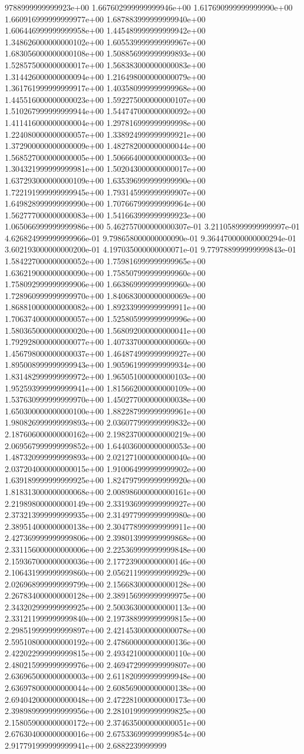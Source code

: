 9788999999999923e+00	1.667602999999999946e+00	1.617690999999999990e+00	1.660916999999999977e+00	1.687883999999999940e+00	1.606446999999999958e+00	1.445489999999999942e+00	1.348626000000000102e+00	1.605539999999999967e+00	1.683056000000000108e+00	1.508856999999999893e+00	1.528575000000000017e+00	1.568383000000000083e+00	1.314426000000000094e+00	1.216498000000000079e+00	1.361761999999999917e+00	1.403580999999999968e+00	1.445516000000000023e+00	1.592275000000000107e+00	1.510267999999999944e+00	1.544747000000000092e+00	1.411416000000000004e+00	1.297816999999999998e+00	1.224080000000000057e+00	1.338924999999999921e+00	1.372900000000000009e+00	1.482782000000000044e+00	1.568527000000000005e+00	1.506664000000000003e+00	1.304321999999999981e+00	1.502043000000000017e+00	1.637293000000000109e+00	1.635396999999999990e+00	1.722191999999999945e+00	1.793145999999999907e+00	1.649828999999999990e+00	1.707667999999999964e+00	1.562777000000000083e+00	1.541663999999999923e+00	1.065066999999999986e+00	5.462757000000000307e-01	3.211058999999999997e-01	4.626824999999999966e-01	9.798658000000000090e-01	9.364470000000000294e-01	3.602193000000000200e-01	4.197035000000000071e-01	9.779788999999999843e-01	1.584227000000000052e+00	1.759816999999999965e+00	1.636219000000000090e+00	1.758507999999999960e+00	1.758092999999999906e+00	1.663869999999999960e+00	1.728960999999999970e+00	1.840683000000000069e+00	1.868810000000000082e+00	1.892339999999999911e+00	1.706374000000000057e+00	1.525805999999999996e+00	1.580365000000000020e+00	1.568092000000000041e+00	1.792928000000000077e+00	1.407337000000000060e+00	1.456798000000000037e+00	1.464874999999999927e+00	1.895008999999999943e+00	1.905961999999999934e+00	1.831482999999999972e+00	1.965051000000000103e+00	1.952593999999999941e+00	1.815662000000000109e+00	1.537630999999999970e+00	1.450277000000000038e+00	1.650300000000000100e+00	1.882287999999999961e+00	1.980826999999999893e+00	2.036077999999999832e+00	2.187606000000000162e+00	2.198237000000000219e+00	2.069567999999999852e+00	1.644036000000000053e+00	1.487320999999999893e+00	2.021271000000000040e+00	2.037204000000000015e+00	1.910064999999999902e+00	1.639189999999999925e+00	1.824797999999999920e+00	1.818313000000000068e+00	2.008986000000000161e+00	2.219898000000000149e+00	2.331936999999999927e+00	2.373213999999999935e+00	2.314977999999999980e+00	2.389514000000000138e+00	2.304778999999999911e+00	2.427369999999999806e+00	2.398013999999999868e+00	2.331156000000000006e+00	2.225369999999999848e+00	2.159367000000000036e+00	2.177239000000000146e+00	2.106431999999999860e+00	2.056211999999999929e+00	2.026968999999999799e+00	2.156683000000000128e+00	2.267834000000000128e+00	2.389156999999999975e+00	2.343202999999999925e+00	2.500363000000000113e+00	2.331211999999999840e+00	2.197388999999999815e+00	2.298519999999999897e+00	2.421453000000000078e+00	2.595108000000000192e+00	2.478600000000000136e+00	2.422022999999999815e+00	2.493421000000000110e+00	2.480215999999999976e+00	2.469472999999999807e+00	2.636965000000000003e+00	2.611820999999999948e+00	2.636978000000000044e+00	2.608569000000000138e+00	2.694042000000000048e+00	2.472281000000000173e+00	2.398989999999999956e+00	2.281019999999999825e+00	2.158059000000000172e+00	2.374635000000000051e+00	2.676304000000000016e+00	2.675336999999999854e+00	2.917791999999999941e+00	2.6882239999999